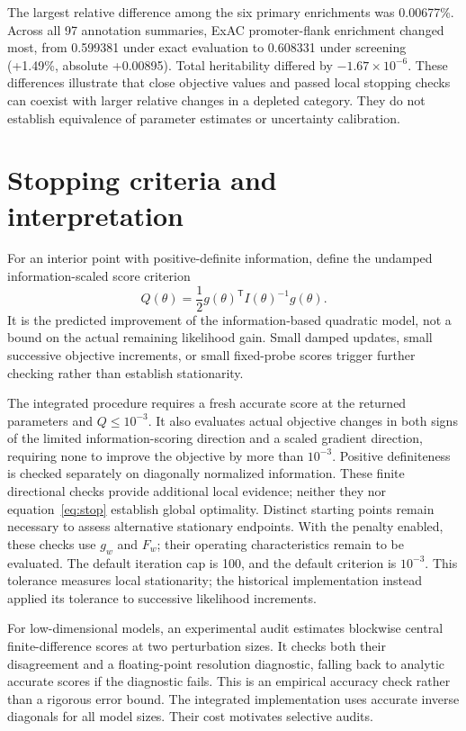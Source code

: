 \documentclass[11pt]{article}
\begin{document}
The largest relative difference among the six primary enrichments was 0.00677\%. Across all 97 annotation summaries, ExAC promoter-flank enrichment changed most, from 0.599381 under exact evaluation to 0.608331 under screening (+1.49\%, absolute +0.00895). Total heritability differed by $-1.67\times10^{-6}$. These differences illustrate that close objective values and passed local stopping checks can coexist with larger relative changes in a depleted category. They do not establish equivalence of parameter estimates or uncertainty calibration.

\section{Stopping criteria and interpretation}
For an interior point with positive-definite information, define the undamped information-scaled score criterion
\begin{equation}
 Q(\theta)=\frac12g(\theta)^\mathsf{T}I(\theta)^{-1}g(\theta).
 \label{eq:stop}
\end{equation}
It is the predicted improvement of the information-based quadratic model, not a bound on the actual remaining likelihood gain. Small damped updates, small successive objective increments, or small fixed-probe scores trigger further checking rather than establish stationarity.

The integrated procedure requires a fresh accurate score at the returned parameters and $Q\leq10^{-3}$. It also evaluates actual objective changes in both signs of the limited information-scoring direction and a scaled gradient direction, requiring none to improve the objective by more than $10^{-3}$. Positive definiteness is checked separately on diagonally normalized information. These finite directional checks provide additional local evidence; neither they nor equation~\eqref{eq:stop} establish global optimality. Distinct starting points remain necessary to assess alternative stationary endpoints. With the penalty enabled, these checks use $g_w$ and $F_w$; their operating characteristics remain to be evaluated. The default iteration cap is 100, and the default criterion is $10^{-3}$. This tolerance measures local stationarity; the historical implementation instead applied its tolerance to successive likelihood increments.

For low-dimensional models, an experimental audit estimates blockwise central finite-difference scores at two perturbation sizes. It checks both their disagreement and a floating-point resolution diagnostic, falling back to analytic accurate scores if the diagnostic fails. This is an empirical accuracy check rather than a rigorous error bound. The integrated implementation uses accurate inverse diagonals for all model sizes. Their cost motivates selective audits.
\end{document}
